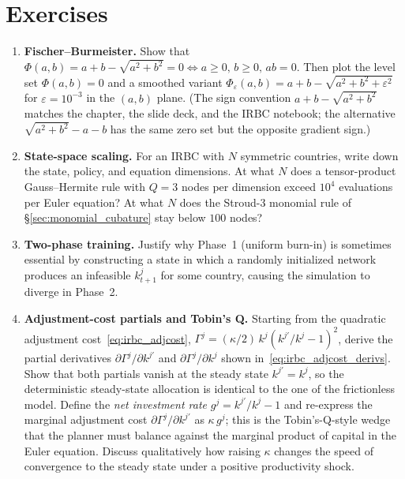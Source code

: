 \documentclass[11pt,a4paper]{report}
\begin{document}
\section*{Exercises}
\begin{enumerate}[itemsep=4pt, leftmargin=*]
\item\label{ex:ch3:1} \textbf{Fischer--Burmeister.}  Show that $\Phi(a,b) = a + b - \sqrt{a^2+b^2} = 0 \iff a\ge 0,\, b\ge 0,\, ab=0$.  Then plot the level set $\Phi(a,b)=0$ and a smoothed variant $\Phi_\varepsilon(a,b) = a + b - \sqrt{a^2+b^2+\varepsilon^2}$ for $\varepsilon=10^{-3}$ in the $(a,b)$ plane.  (The sign convention $a+b-\sqrt{a^2+b^2}$ matches the chapter, the slide deck, and the IRBC notebook; the alternative $\sqrt{a^2+b^2}-a-b$ has the same zero set but the opposite gradient sign.)
\item\label{ex:ch3:2} \textbf{State-space scaling.}  For an IRBC with $N$ symmetric countries, write down the state, policy, and equation dimensions.  At what $N$ does a tensor-product Gauss--Hermite rule with $Q=3$ nodes per dimension exceed $10^4$ evaluations per Euler equation?  At what $N$ does the Stroud-3 monomial rule of \S\ref{sec:monomial_cubature} stay below $100$ nodes?
\item\label{ex:ch3:3} \textbf{Two-phase training.}  Justify why Phase~1 (uniform burn-in) is sometimes essential by constructing a state in which a randomly initialized network produces an infeasible $k_{t+1}^j$ for some country, causing the simulation to diverge in Phase~2.
\item\label{ex:ch3:4} \textbf{Adjustment-cost partials and Tobin's Q.}  Starting from the quadratic adjustment cost~\eqref{eq:irbc_adjcost}, $\Gamma^j = (\kappa/2)\,k^j (k^{j\prime}/k^j - 1)^2$, derive the partial derivatives $\partial\Gamma^j/\partial k^{j\prime}$ and $\partial\Gamma^j/\partial k^j$ shown in~\eqref{eq:irbc_adjcost_derivs}.  Show that both partials vanish at the steady state $k^{j\prime} = k^j$, so the deterministic steady-state allocation is identical to the one of the frictionless model.  Define the \emph{net investment rate} $g^j = k^{j\prime}/k^j - 1$ and re-express the marginal adjustment cost $\partial\Gamma^j/\partial k^{j\prime}$ as $\kappa\,g^j$; this is the Tobin's-Q-style wedge that the planner must balance against the marginal product of capital in the Euler equation.  Discuss qualitatively how raising $\kappa$ changes the speed of convergence to the steady state under a positive productivity shock.

\end{enumerate}
\end{document}
